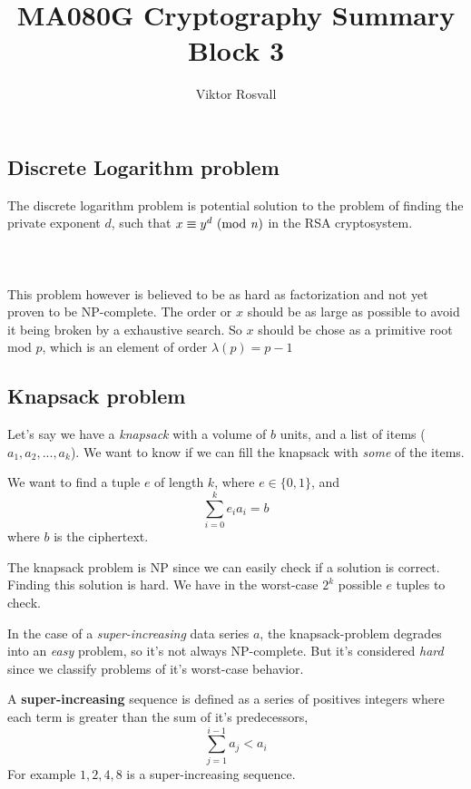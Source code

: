 \documentclass[12pt]{article}
\title{MA080G Cryptography Summary Block 3}
\author{Viktor Rosvall}
\begin{document}
	\maketitle
	
	
	\subsection*{Discrete Logarithm problem \cite{discrete-log}}
	The discrete logarithm problem is potential solution to the problem of finding the private exponent $d$, such that $x \equiv y^d \text{ (mod \textit{n})}$ in the RSA cryptosystem.
	\\
	\\
	\\
	\\
	This problem however is believed to be as hard as factorization and not yet proven to be NP-complete. The order or $x$ should be as large as possible to avoid it being broken by a exhaustive search. So $x$ should be chose as a primitive root mod $p$, which is an element of order $\lambda(p) = p-1$
	
	
	
	\subsection*{Knapsack problem \cite{knapsack-problem}}
	Let's say we have a \textit{knapsack} with a volume of $b$ units, and a list of items ($a_1, a_2,...,a_k$). We want to know if we can fill the knapsack with \textit{some} of the items. 
	
	We want to find a tuple $e$ of length $k$, where $e \in \{0,1\}$, and 
	$$
	\sum_{i = 0}^{k}e_ia_i = b
	$$
	where $b$ is the ciphertext.
	
	The knapsack problem is NP since we can easily check if a solution is correct. Finding this solution is hard. We have in the worst-case $2^k$ possible $e$ tuples to check. 
	
	In the case of a \textit{super-increasing} data series $a$, the knapsack-problem degrades into an \textit{easy} problem, so it's not always NP-complete. But it's considered \textit{hard} since we classify problems of it's worst-case behavior. 
	
	A \textbf{super-increasing} sequence is defined as a series of positives integers where each term is greater than the sum of it's predecessors, 
	$$
	\sum_{j=1}^{i-1}a_j<a_i
	$$
	For example $1,2,4,8$ is a super-increasing sequence.
	
\end{document}
